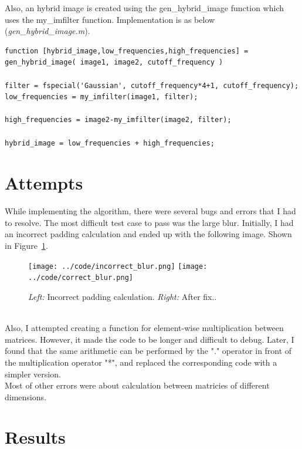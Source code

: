 Also, an hybrid image is created using the gen\_hybrid\_image function which uses the my\_imfilter function.
Implementation is as below (\emph{gen\_hybrid\_image.m}).

\begin{lstlisting}[style=Matlab-editor]
function [hybrid_image,low_frequencies,high_frequencies] = gen_hybrid_image( image1, image2, cutoff_frequency )

filter = fspecial('Gaussian', cutoff_frequency*4+1, cutoff_frequency);
low_frequencies = my_imfilter(image1, filter);

high_frequencies = image2-my_imfilter(image2, filter);

hybrid_image = low_frequencies + high_frequencies;
\end{lstlisting}

\section*{Attempts}

While implementing the algorithm, there were several bugs and errors that I had to resolve.
The most difficult test case to pass was the large blur. Initially, I had an incorrect padding calculation and ended up with the following image. Shown in Figure~\ref{fig:result1}.
\begin{figure}[h!]
	\centering
	\texttt{[image: ../code/incorrect\_blur.png]}
	\texttt{[image: ../code/correct\_blur.png]}
	\caption{\emph{Left:} Incorrect padding calculation. \emph{Right:} After fix..}
	\label{fig:result1}
\end{figure}
\\Also, I attempted creating a function for element-wise multiplication between matrices. However, it made the code to be longer and difficult to debug. Later, I found that the same arithmetic can be performed by the "." operator in front of the multiplication operator "*", and replaced the corresponding code with a simpler version.
\\Most of other errors were about calculation between matricies of different dimensions.

\section*{Results}

